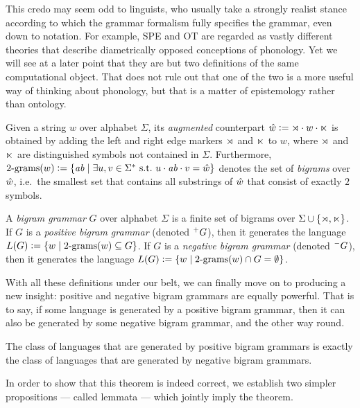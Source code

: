 This credo may seem odd to linguists, who usually take a strongly realist stance according to which the grammar formalism fully specifies the grammar, even down to notation.
For example, SPE and OT are regarded as vastly different theories that describe diametrically opposed conceptions of phonology.
Yet we will see at a later point that they are but two definitions of the same computational object.
That does not rule out that one of the two is a more useful way of thinking about phonology, but that is a matter of epistemology rather than ontology.

\begin{definition}[Bigrams]
    Given a string $w$ over alphabet $\Sigma$, its \emph{augmented} counterpart $\hat{w} \mathrel{\mathop:}= \rtimes \cdot w \cdot \ltimes$ is obtained by adding the left and right edge markers $\rtimes$ and $\ltimes$ to $w$, where $\rtimes$ and $\ltimes$ are distinguished symbols not contained in $\Sigma$.
    Furthermore, 
    \(
    \mathrm{2\text{-}grams}(w) \mathrel{\mathop:}=
        \left \{ 
            \mathit{ab} \mid \exists u,v \in \Sigma^* \text{ s.t.\ }
                u \cdot \mathit{ab} \cdot v = \hat{w}
         \right \}
    \)
    denotes the set of \emph{bigrams} over $\hat{w}$, i.e.\ the smallest set that contains all substrings of $\hat{w}$ that consist of exactly $2$ symbols.
\end{definition}

\begin{definition}
    A \emph{bigram grammar} $G$ over alphabet $\Sigma$ is a finite set of bigrams over $\Sigma \cup \left \{ \rtimes, \ltimes \right \}$.
    If $G$ is a \emph{positive bigram grammar} (denoted $^+ G$), then it generates the language
    \(
        L(G) \mathrel{\mathop:}= \left \{ 
            w \mid \mathrm{2\text{-}grams}(w) \subseteq G
         \right \}
    \).
    If $G$ is a \emph{negative bigram grammar} (denoted $^- G$), then it generates the language
    \(
        L(G) \mathrel{\mathop:}= \left \{ 
            w \mid \mathrm{2\text{-}grams}(w) \cap G = \emptyset
         \right \}
    \).
\end{definition}

With all these definitions under our belt, we can finally move on to producing a new insight: positive and negative bigram grammars are equally powerful.
That is to say, if some language is generated by a positive bigram grammar, then it can also be generated by some negative bigram grammar, and the other way round.

\begin{theorem}
    The class of languages that are generated by positive bigram grammars is exactly the class of languages that are generated by negative bigram grammars.
    \label{thm:SL_PosNegEquivalence}
\end{theorem}
%
In order to show that this theorem is indeed correct, we establish two simpler propositions --- called lemmata --- which jointly imply the theorem.

